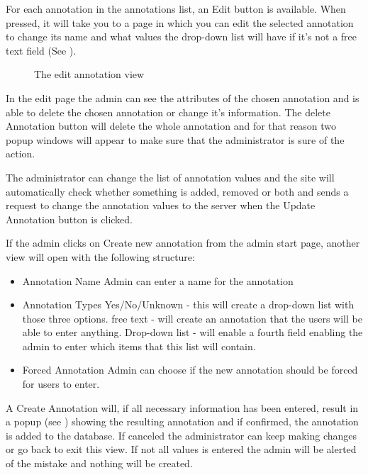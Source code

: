 For each annotation in the annotations list, an Edit button is available. 
When pressed, it will take you to a page in which you can edit the selected annotation to change its name and what values the drop-down list will have if it's not a free text field (See ). 

\begin{figure}[h]
 \caption{The edit annotation view}
 \label{adm_web_editView}
\end{figure}
In the edit page the admin can see the attributes of the chosen annotation and is able to delete the chosen annotation or change it's information.
The delete Annotation button will delete the whole annotation and for that reason two popup windows will appear to make sure that the administrator is sure of the action.

The administrator can change the list of annotation values and the site will automatically check whether 
something is added, removed or both and sends a request to change the annotation values to the server when the Update Annotation button is clicked.

If the admin clicks on Create new annotation from the admin start page, another view will open with the following structure:
\begin{itemize}
 \item Annotation Name
 \subitem Admin can enter a name for the annotation
 
 \item Annotation Types
 \subitem Yes/No/Unknown - this will create a drop-down list with those three options.
 \subitem free text - will create an annotation that the users will be able to enter anything.
 \subitem Drop-down list - will enable a fourth field enabling the admin to enter which items that this list will contain.
 
 \item Forced Annotation
 \subitem Admin can choose if the new annotation should be forced for users to enter. 
\end{itemize}

A Create Annotation will, if all necessary information has been entered, result in a popup (see ) showing the resulting annotation and if confirmed, the annotation is added to the database. 
If canceled the administrator can keep making changes or go back to exit this view. If not all values is entered the admin will be alerted of the mistake and nothing will be created.

